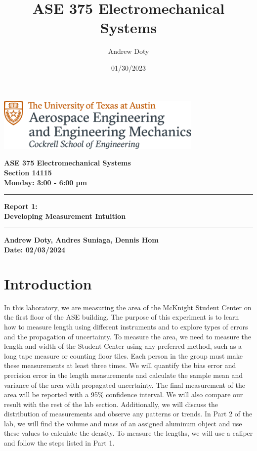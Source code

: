 \documentclass{article}
\title{ASE 375 Electromechanical Systems}
\author{Andrew Doty}
\date{01/30/2023}
\begin{document}
\begin{titlepage}
  \centering
  \includegraphics[width=10cm]{ase-logo-formal.png}  %
  \vspace{1cm}  %
 
  \Large \textbf{ASE 375 Electromechanical Systems}\\
  \large \textbf{Section 14115}\\
  \vspace{0.5cm}
  \textbf{Monday: 3:00 - 6:00 pm}\\
 
  \vspace{1cm}
 
  \hrule
  \vspace{0.5cm}
 
  \Huge \textbf{Report 1:}\\
  \Huge \textbf{Developing Measurement Intuition}\\
 
  \vspace{0.5cm}
  \hrule
 
  \vspace{1cm}
 
  \normalsize \textbf{Andrew Doty, Andres Suniaga, Dennis Hom}\\
  \normalsize \textbf{Date: 02/03/2024}
 
\end{titlepage}
\newpage

\tableofcontents
\thispagestyle{empty}
\newpage



\section{Introduction}
In this laboratory, we are measuring the area of the McKnight Student Center on the first floor of the ASE building. The purpose of this experiment is to learn how to measure length using different instruments and to explore types of errors and the propagation of uncertainty. To measure the area, we need to measure the length and width of the Student Center using any preferred method, such as a long tape measure or counting floor tiles. Each person in the group must make these measurements at least three times. We will quantify the bias error and precision error in the length measurements and calculate the sample mean and variance of the area with propagated uncertainty. The final measurement of the area will be reported with a 95\% confidence interval. We will also compare our result with the rest of the lab section. Additionally, we will discuss the distribution of measurements and observe any patterns or trends. In Part 2 of the lab, we will find the volume and mass of an assigned aluminum object and use these values to calculate the density. To measure the lengths, we will use a caliper and follow the steps listed in Part 1.
\end{document}
